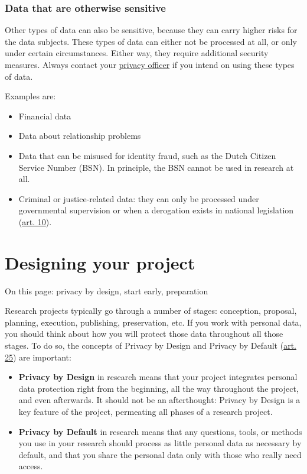\documentclass[
]{book}
\providecommand{\tightlist}{%
  \setlength{\itemsep}{0pt}\setlength{\parskip}{0pt}}
\begin{document}
\hypertarget{data-that-are-otherwise-sensitive}{%
\subsection{Data that are otherwise sensitive}\label{data-that-are-otherwise-sensitive}}

Other types of data can also be sensitive, because they can carry higher risks
for the data subjects. These types of data can either not be processed at all,
or only under certain circumstances. Either way, they require additional
security measures. Always contact your \protect\hyperlink{support}{privacy officer}
if you intend on using these types of data.

Examples are:

\begin{itemize}
\tightlist
\item
  Financial data
\item
  Data about relationship problems
\item
  Data that can be misused for identity fraud, such as the Dutch Citizen
  Service Number (BSN). In principle, the BSN cannot be used in research at all.
\item
  Criminal or justice-related data: they can only be processed under
  governmental supervision or when a derogation exists in national legislation
  (\href{https://gdpr-info.eu/art-10-gdpr/}{art. 10}).
\end{itemize}

\hypertarget{privacy-by-design}{%
\chapter{Designing your project}\label{privacy-by-design}}

On this page: privacy by design, start early, preparation

Research projects typically go through a number of stages: conception, proposal,
planning, execution, publishing, preservation, etc. If you work with personal
data, you should think about how you will protect those data throughout all
those stages. To do so, the concepts of Privacy by Design and Privacy by Default
(\href{https://gdpr-info.eu/art-25-gdpr/}{art. 25}) are
important:

\begin{itemize}
\tightlist
\item
  \textbf{Privacy by Design} in research means that your project integrates personal
  data protection right from the beginning, all the way throughout the project,
  and even afterwards. It should not be an afterthought: Privacy by Design is a
  key feature of the project, permeating all phases of a research project.
\item
  \textbf{Privacy by Default} in research means that any questions, tools, or methods
  you use in your research should process as little personal data as necessary by
  default, and that you share the personal data only with those who really need
  access.
\end{itemize}
\end{document}

